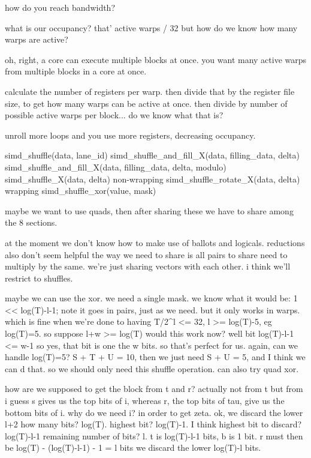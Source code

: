 how do you reach bandwidth?

what is our occupancy?
that' active warps / 32
but how do we know how many warps are active?

oh, right, a core can execute multiple blocks at once. you want many active warps from multiple blocks in a core at once. 

calculate the number of registers per warp.
then divide that by the register file size, to get how many warps can be active at once. 
then divide by number of possible active warps per block... do we know what that is?

unroll more loops and you use more registers, decreasing occupancy. 

simd_shuffle(data, lane_id)
simd_shuffle_and_fill_X(data, filling_data, delta)
simd_shuffle_and_fill_X(data, filling_data, delta, modulo)
simd_shuffle_X(data, delta)
    non-wrapping
simd_shuffle_rotate_X(data, delta)
    wrapping
simd_shuffle_xor(value, mask)

maybe we want to use quads, then after sharing these we have to share among the 8 sections. 

at the moment we don't know how to make use of ballots and logicals.
reductions also don't seem helpful
the way we need to share is all pairs to share need to multiply by the same.
we're just sharing vectors with each other. 
i think we'll restrict to shuffles.

maybe we can use the xor.
we need a single mask. 
we know what it would be: 1 << log(T)-l-1;
note it goes in pairs, just as we need.
but it only works in warps.
which is fine when we're done to having T/2^l <= 32, l >= log(T)-5, eg log(T)=5.
so suppose l+w >= log(T)
would this work now? well bit log(T)-l-1 <= w-1 so yes, that bit is one the w bits. 
so that's perfect for us.
again, can we handle log(T)=5?
S + T + U = 10, then we just need S + U = 5, and I think we can d that.
so we should only need this shuffle operation.
can also try quad xor. 

how are we supposed to get the block from t and r?
actually not from t but from 
i guess s gives us the top bits of i, whereas r, the top bits of tau, give us the bottom bits of i.
why do we need i? in order to get zeta.
ok, we discard the lower l+2 
how many bits? log(T). 
highest bit? log(T)-1.
I think highest bit to discard? log(T)-l-1
remaining number of bits? l.
t is log(T)-l-1 bits, b is 1 bit.
r must then be log(T) - (log(T)-l-1) - 1 = l bits
we discard the lower log(T)-l bits.

